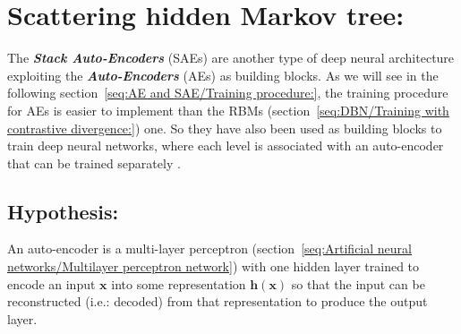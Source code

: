 \documentclass[a4paper,11pt]{report}
\newcommand{\Important}[1]{\textbf{{\em #1}}}
\begin{document}
		
% 		
% 		
		
\chapter{Scattering hidden Markov tree:}
	\label{chap:AE and SAE:}
	The \Important{Stack Auto-Encoders} (SAEs) are another type of deep neural architecture exploiting the \Important{Auto-Encoders} (AEs) as building blocks. As we will see in the following section~\ref{seq:AE and SAE/Training procedure:}, the training procedure for AEs is easier to implement than the RBMs (section~\ref{seq:DBN/Training with contrastive divergence:}) one. So they have also been used as building blocks to train deep neural networks, where each level is associated with an auto-encoder that can be trained separately \cite{Larochelle_2007, Ranzato_2007, Vincent_2008,Bengio_2007}.
	
	
	\section{Hypothesis:}
		\label{seq:AE and SAE/AEs:}
		An auto-encoder is a multi-layer perceptron (section~\ref{seq:Artificial neural networks/Multilayer perceptron network}) with one hidden layer trained to encode an input $\mathbf{x}$ into some representation $\mathbf{h(x)}$ so that the input can be reconstructed (i.e.: decoded) from that representation to produce the output layer. \\\par
		
\end{document}

